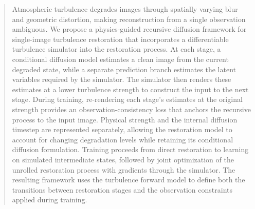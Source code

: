\begin{abstract}
Atmospheric turbulence degrades images through spatially varying blur and geometric distortion, making reconstruction from a single observation ambiguous.
We propose a physics-guided recursive diffusion framework for single-image turbulence restoration that incorporates a differentiable turbulence simulator into the restoration process.
At each stage, a conditional diffusion model estimates a clean image from the current degraded state, while a separate prediction branch estimates the latent variables required by the simulator.
The simulator then renders these estimates at a lower turbulence strength to construct the input to the next stage.
During training, re-rendering each stage's estimates at the original strength provides an observation-consistency loss that anchors the recursive process to the input image.
Physical strength and the internal diffusion timestep are represented separately, allowing the restoration model to account for changing degradation levels while retaining its conditional diffusion formulation.
Training proceeds from direct restoration to learning on simulated intermediate states, followed by joint optimization of the unrolled restoration process with gradients through the simulator.
The resulting framework uses the turbulence forward model to define both the transitions between restoration stages and the observation constraints applied during training.
\end{abstract}
